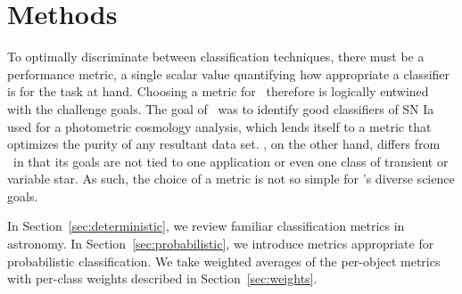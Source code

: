 \section{Methods}
\label{sec:methods}


To optimally discriminate between classification techniques, there must be a performance metric, a single scalar value quantifying how appropriate a classifier is for the task at hand.
Choosing a metric for \plasticc\ therefore is logically entwined with the challenge goals.
The goal of \snphotcc\ was to identify good classifiers of SN Ia used for a photometric cosmology analysis, which lends itself to a metric that optimizes the purity of any resultant data set.
\plasticc, on the other hand, differs from \snphotcc\ in that its goals are not tied to one application or even one class of transient or variable star.
As such, the choice of a metric is not so simple for \plasticc's diverse science goals.


In Section~\ref{sec:deterministic}, we review familiar classification metrics in astronomy.
In Section~\ref{sec:probabilistic}, we introduce metrics appropriate for probabilistic classification.
We take weighted averages of the per-object metrics with per-class weights described in Section~\ref{sec:weights}.

